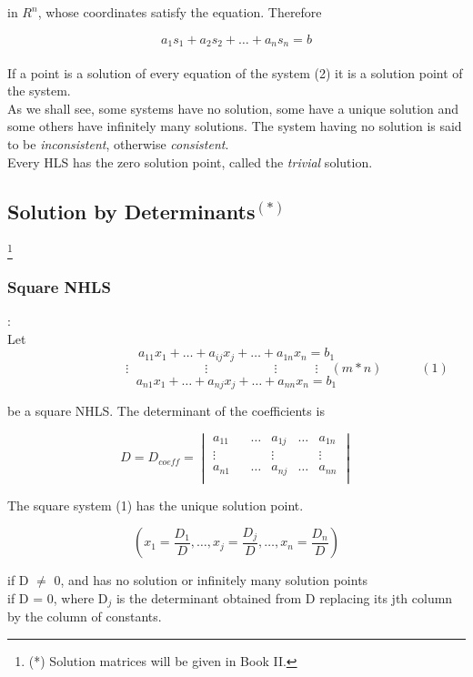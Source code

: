 \documentclass[11pt]{amsbook}
\begin{document}

in \(R^{n}\), whose coordinates satisfy the equation. Therefore

\[a_{1}s_{1}+a_{2}s_{2}+\dots+a_{n}s_{n}=b\]
\\
If a point is a solution of every equation of the system (2) it is a solution point of the system.
\\
As we shall see, some systems have no solution, some have a unique solution and some others have infinitely many solutions. The system having no solution is said to be \textit{inconsistent}, otherwise \textit{consistent}.
\\
Every HLS has the zero solution point, called the \textit{trivial} solution.
\\
\subsection{Solution by Determinants\(^{(*)}\)}
\label{subsec:SolutionbyDeterminants}
\footnote{(*) Solution matrices will be given in Book II.}
\\

\subsubsection{Square NHLS}:
\label{subsubsec:SquareNHLS}
\\

Let  \[a_{11}x_{1}+\dots+a_{ij}x_{j}+\dots+a_{1n}x_{n}=b_{1}\]
\[\quad\quad\quad\quad\quad\quad\quad\quad
\vdots\quad\quad\quad\quad\quad\quad
\vdots\quad\quad\quad\quad\quad\
\vdots\quad\quad\quad\vdots
\quad(m*n)
\quad\quad\quad(1)
\]
\[a_{n1}x_{1}+\dots+a_{nj}x_{j}+\dots+a_{nn}x_{n}=b_{1}\]

be a square NHLS. The determinant of the coefficients is

\[
D=D_{coeff}= \begin{vmatrix} 
    a_{11} &        & \dots  & a_{1j} &  \dots & a_{1n} \\
    \vdots &        &        & \vdots &        & \vdots \\
    a_{n1} &        & \dots  & a_{nj} &  \dots & a_{nn} \\
    \end{vmatrix}
\]

\begin{thm}
	The square system (1) has the unique solution point.

	\[
		\left(
			x_1 = \frac{D_1}{D} , \dots ,
			x_j = \frac{D_j}{D} , \dots ,
			x_n = \frac{D_n}{D}
		\right)
	\]

	if D \(\neq\) 0, and has no solution or infinitely many solution points
	\\
	if D = 0, where D\(_j\) is the determinant obtained from D replacing its jth column by the column of constants.
\end{thm}

\end{document}
